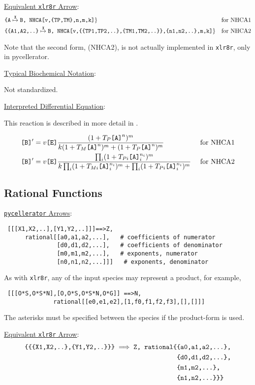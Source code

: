 \underline{Equivalent {\tt xlr8r} Arrow}: 
\begin{align*}
&\text{\tt{\{A}}\overset{\text{\tt{X}}}{\mapsto}\text{\tt{B, }} \text{\tt{NHCA[v,\{TP,TM\},n,m,k]}}\} &\text{for NHCA1}\\
&\text{\tt{\{\{A1,A2,..\}}}\overset{\text{\tt{X}}}{\mapsto}\text{\tt{B, }} \text{\tt{NHCA[v,\{\{TP1,TP2,..\},\{TM1,TM2,..\}\},\{n1,n2,..\},m,k]}}\}&\text{for NHCA2}
\end{align*}

Note that the second form, (NHCA2), is not actually implemented in {\tt xlr8r}, only in pycellerator. 

\underline{Typical Biochemical Notation}: 

Not standardized.

\underline{Interpreted Differential Equation}:

This reaction is described in more detail in \cite{ICSB2001}.

\begin{align*}
\text{\tt{[B]}}'&=v\text{\tt{[E]}}\dfrac
{(1+T_P \text{\tt{[A]}}^{n})^{m}}
{k(1+T_M\text{\tt{[A]}}^n)^{m} + (1+T_P\text{\tt{[A]}}^n)^{m}}
&\text{ for NHCA1}
\\
\text{\tt{[B]}}'&=v\text{\tt{[E]}}\dfrac
{\prod_i(1+T_{Pi} \text{\tt{[A]}}_i^{n_i})^{m}}
{k\prod_i (1+T_{Mi}\text{\tt{[A]}}_i^{n_i})^{m} + \prod_i(1+T_{Pi}\text{\tt{[A]}}_i^{n_i})^{m}}
&\text{ for NHCA2}
\end{align*}

\subsection{Rational Functions}
\label{subsection:Rational}
\underline{{\tt pycellerator} Arrows}:

\begin{lstlisting}
 [[[X1,X2,..],[Y1,Y2,..]]]==>Z, 
      rational[[a0,a1,a2,...],   # coefficients of numerator
               [d0,d1,d2,...],   # coefficients of denominator
               [m0,m1,m2,...],   # exponents, numerator
               [n0,n1,n2,...]]]   # exponents, denominator
\end{lstlisting}

As with {\tt xlr8r}, any of the input species may represent a product, for example, 
\begin{lstlisting}
 [[[O*S,O*S*N],[O,O*S,O*S*N,O*G]] ==>N, 
              rational[[e0,e1,e2],[1,f0,f1,f2,f3],[],[]]]
\end{lstlisting}
The asterisks must be specified between the species if the product-form is used.

\underline{Equivalent {\tt xlr8r} Arrow}: 
\begin{align*}
{\text{\tt\{\{\{X1,X2,..\},\{Y1,Y2,..\}\}\}}}\implies{\text{\tt Z, rational\{}}&{\text{\tt\{a0,a1,a2,...\},}}\\
&{\text{\tt\{d0,d1,d2,...\},}}\\
&{\text{\tt\{m1,m2,...\},}}\\
&{\text{\tt\{n1,n2,...\}\}\}}}
\end{align*}


